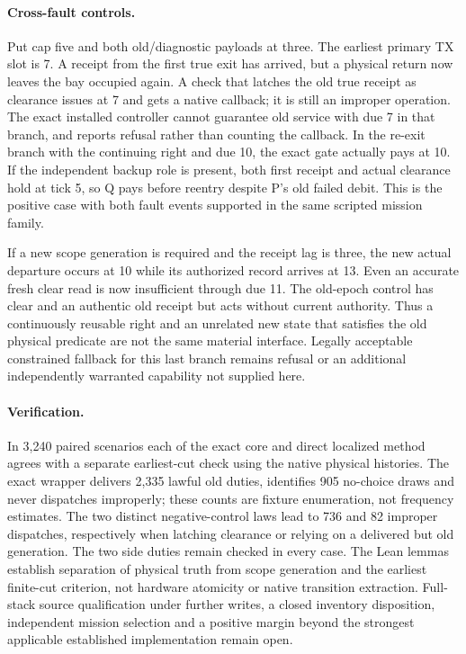 \documentclass{article}
\begin{document}
\paragraph{Cross-fault controls.}
Put cap five and both old/diagnostic payloads at three.
The earliest primary TX slot is 7. A receipt from the first
true exit has arrived, but a physical return now leaves the bay
occupied again. A check that latches the old true receipt as
clearance issues at 7 and gets a native callback; it is still
an improper operation. The exact installed controller cannot
guarantee old service with due 7 in that branch, and reports
refusal rather than counting the callback. In the re-exit
branch with the continuing right and due 10, the exact gate
actually pays at 10. If the independent backup role is
present, both first receipt and actual clearance hold at
tick 5, so Q pays before reentry despite P's old failed debit.
This is the positive case with both fault events supported in
the same scripted mission family.

If a new scope generation is required and the receipt lag is
three, the new actual departure occurs at 10 while its
authorized record arrives at 13. Even an accurate fresh clear
read is now insufficient through due 11. The old-epoch control
has clear and an authentic old receipt but acts without current
authority. Thus a continuously reusable right and an unrelated
new state that satisfies the old physical predicate are not the
same material interface. Legally acceptable constrained
fallback for this last branch remains refusal or an additional
independently warranted capability not supplied here.

\paragraph{Verification.}
In 3,240 paired scenarios each of the exact core and direct
localized method agrees with a separate earliest-cut check
using the native physical histories. The exact wrapper delivers
2,335 lawful old duties, identifies 905 no-choice draws and
never dispatches improperly; these counts are fixture enumeration,
not frequency estimates. The two distinct negative-control
laws lead to 736 and 82 improper dispatches, respectively
when latching clearance or relying on a delivered but old
generation. The two side duties remain checked in every case.
The Lean lemmas establish separation of physical truth from
scope generation and the earliest finite-cut criterion,
not hardware atomicity or native transition extraction.
Full-stack source qualification under further writes, a closed
inventory disposition, independent mission selection and a
positive margin beyond the strongest applicable established
implementation remain open.
\end{document}
